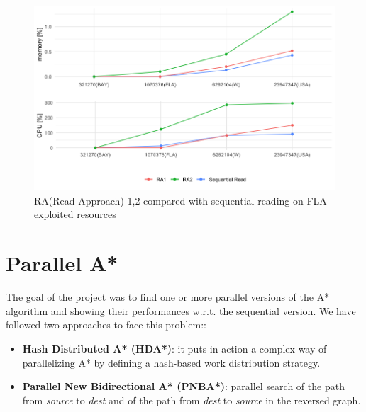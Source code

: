 \documentclass[12pt]{beamer}
\begin{document}
	\begin{frame}{\secname}
		\framesubtitle{\subsecname}
		\begin{figure}[ht!]
			\centering
			\includegraphics[width=1\linewidth]{read/parread_cpumem.png}
			\caption{RA(Read Approach) 1,2 compared with sequential reading on FLA - exploited resources}
			\label{parreadallcpumem}
		  \end{figure}
	\end{frame}
	\section{Parallel A*}
	\begin{frame}{\secname}
		The goal of the project was to find one or more parallel versions of the A* algorithm 
		and showing their performances w.r.t. the sequential version. We have followed two approaches
		to face this problem:: 
		\begin{itemize}
			\item \textbf{Hash Distributed A* (HDA*)}: it puts in action a complex way of parallelizing A* by defining a hash-based work distribution strategy.
		    \item \textbf{Parallel New Bidirectional A* (PNBA*)}: parallel search of the path from \textit{source} to \textit{dest}
				  and of the path from \textit{dest} to \textit{source} in the reversed graph.
		\end{itemize}
	\end{frame}
\end{document}
